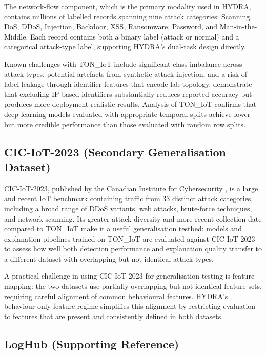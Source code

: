 \documentclass[12pt,a4paper]{report}
\begin{document}
The network-flow component, which is the primary modality used in HYDRA, contains millions of labelled records spanning nine attack categories: Scanning, DoS, DDoS, Injection, Backdoor, XSS, Ransomware, Password, and Man-in-the-Middle. Each record contains both a binary label (attack or normal) and a categorical attack-type label, supporting HYDRA's dual-task design directly.

Known challenges with TON\_IoT include significant class imbalance across attack types, potential artefacts from synthetic attack injection, and a risk of label leakage through identifier features that encode lab topology. \citet{ogunseyi2026} demonstrate that excluding IP-based identifiers substantially reduces reported accuracy but produces more deployment-realistic results. Analysis of TON\_IoT \citep{ferrag2022} confirms that deep learning models evaluated with appropriate temporal splits achieve lower but more credible performance than those evaluated with random row splits.

\subsection{CIC-IoT-2023 (Secondary Generalisation Dataset)}
\label{sec:ciciot}

CIC-IoT-2023, published by the Canadian Institute for Cybersecurity \citep{cic2023}, is a large and recent IoT benchmark containing traffic from 33 distinct attack categories, including a broad range of DDoS variants, web attacks, brute-force techniques, and network scanning. Its greater attack diversity and more recent collection date compared to TON\_IoT make it a useful generalisation testbed: models and explanation pipelines trained on TON\_IoT are evaluated against CIC-IoT-2023 to assess how well both detection performance and explanation quality transfer to a different dataset with overlapping but not identical attack types.

A practical challenge in using CIC-IoT-2023 for generalisation testing is feature mapping: the two datasets use partially overlapping but not identical feature sets, requiring careful alignment of common behavioural features. HYDRA's behaviour-only feature regime simplifies this alignment by restricting evaluation to features that are present and consistently defined in both datasets.

\subsection{LogHub (Supporting Reference)}
\label{sec:loghub}
\end{document}
